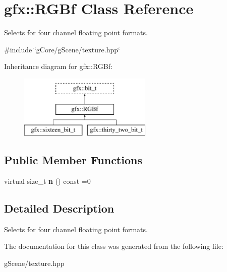 \hypertarget{classgfx_1_1RGBf}{\section{gfx\-:\-:R\-G\-Bf Class Reference}
\label{classgfx_1_1RGBf}
}


Selects for four channel floating point formats.  




{\ttfamily \#include \char`\"{}g\-Core/g\-Scene/texture.\-hpp\char`\"{}}

Inheritance diagram for gfx\-:\-:R\-G\-Bf\-:\begin{figure}[H]
\begin{center}
\leavevmode
\includegraphics[height=3.000000cm]{classgfx_1_1RGBf}
\end{center}
\end{figure}
\subsection*{Public Member Functions}
\begin{DoxyCompactItemize}
\item 
\hypertarget{classgfx_1_1RGBf_ad6992f7733a45fbaf2d90864065fd97a}{virtual size\-\_\-t {\bfseries n} () const =0}\label{classgfx_1_1RGBf_ad6992f7733a45fbaf2d90864065fd97a}

\end{DoxyCompactItemize}


\subsection{Detailed Description}
Selects for four channel floating point formats. 

The documentation for this class was generated from the following file\-:\begin{DoxyCompactItemize}
\item 
g\-Scene/texture.\-hpp\end{DoxyCompactItemize}
